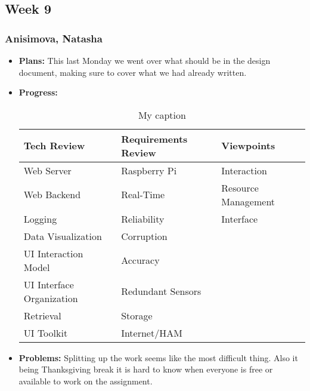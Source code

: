 \documentclass[10pt,draftclsnofoot,onecolumn]{IEEEtran}
\begin{document}
\subsection{Week 9}
\subsubsection{Anisimova, Natasha}
\begin{itemize}
	\item \textbf{Plans: }
	This last Monday we went over what should be in the design document, making sure to cover what we had already written.
	\item \textbf{Progress: }
	\begin{table}[htbp!]
\centering
\caption{My caption}
\label{my-label}
\begin{tabular}{lll}
\hline
\multicolumn{1}{|l|}{Tech Review} & \multicolumn{1}{l|}{Requirements Review} & \multicolumn{1}{l|}{Viewpoints}  \\ \hline
\multicolumn{1}{|l|}{Web Server}  & \multicolumn{1}{l|}{Raspberry Pi}        & \multicolumn{1}{l|}{Interaction} \\ \hline
Web Backend                       & Real-Time                                & Resource Management              \\
Logging                           & Reliability                              & Interface                        \\
Data Visualization                & Corruption                               &                                  \\
UI Interaction Model              & Accuracy                                 &                                  \\
UI Interface Organization         & Redundant Sensors                        &                                  \\
Retrieval                         & Storage                                  &                                  \\
UI Toolkit                        & Internet/HAM                             &                                 
\end{tabular}
\end{table}
	
	\item \textbf{Problems: }
	Splitting up the work seems like the most difficult thing. Also it being Thanksgiving break it is hard to know when everyone is free or available to work on the assignment.
\end{itemize}
\end{document}
